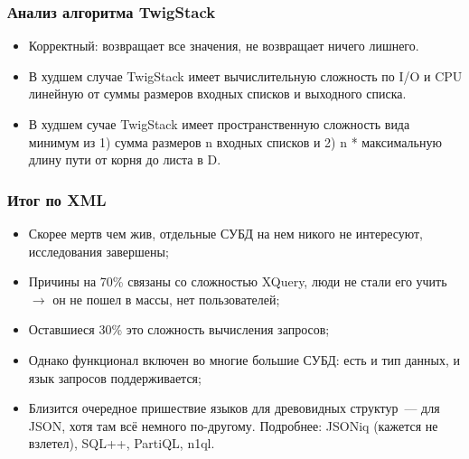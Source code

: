 \documentclass{beamer}
\begin{document}
\begin{frame}
\frametitle{Анализ алгоритма TwigStack}

\begin{itemize}
  \setlength\itemsep{1em}
  \item Корректный: возвращает все значения, не возвращает ничего лишнего.
  \item В худшем случае TwigStack имеет вычислительную сложность по I/O и CPU линейную от суммы размеров входных списков и выходного списка.
  \item В худшем сучае TwigStack имеет пространственную сложность вида минимум из 1) сумма размеров n входных списков и 2) n * максимальную длину пути от корня до листа в D.
  
\end{itemize}
\end{frame}

\begin{frame}
	\frametitle{Итог по XML}
	
	\begin{itemize}
		\setlength\itemsep{1em}
		\item Скорее мертв чем жив, отдельные СУБД на нем никого не интересуют, исследования завершены;
		\item Причины на 70\% связаны со сложностью XQuery, люди не стали его учить $\longrightarrow$ он не пошел в массы, нет пользователей;
		\item Оставшиеся 30\% это сложность вычисления запросов;
		\item Однако функционал включен во многие большие СУБД: есть и тип данных, и язык запросов поддерживается;
		\item Близится очередное пришествие языков для древовидных структур~--- для JSON, хотя там всё немного по-другому. Подробнее: JSONiq (кажется не взлетел), SQL++,  PartiQL, n1ql.
		
	\end{itemize}
\end{frame}
\end{document}
